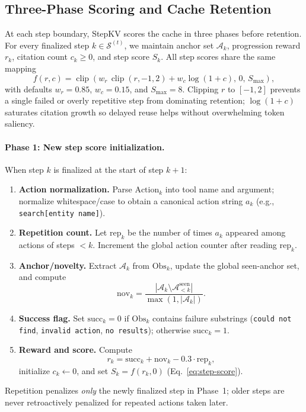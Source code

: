 \documentclass[11pt]{article}
\begin{document}
\subsection{Three-Phase Scoring and Cache Retention}
\label{sec:three-phase}

At each step boundary, StepKV scores the cache in three phases before retention.
For every finalized step $k\in\mathcal{S}^{(t)}$, we maintain anchor set $\mathcal{A}_k$, progression reward $r_k$, citation count $c_k\ge 0$, and step score $S_k$.
All step scores share the same mapping
\begin{equation}
\label{eq:step-score}
f(r,c)=\operatorname{clip}\!\left(w_r\,\operatorname{clip}(r,-1,2)+w_c\log(1+c),\,0,\,S_{\max}\right),
\end{equation}
with defaults $w_r=0.85$, $w_c=0.15$, and $S_{\max}=8$.
Clipping $r$ to $[-1,2]$ prevents a single failed or overly repetitive step from dominating retention; $\log(1+c)$ saturates citation growth so delayed reuse helps without overwhelming token saliency.

\paragraph{Phase 1: New step score initialization.}
When step $k$ is finalized at the start of step $k{+}1$:
\begin{enumerate}[leftmargin=*, nosep]
    \item \textbf{Action normalization.} Parse $\text{Action}_k$ into tool name and argument; normalize whitespace/case to obtain a canonical action string $a_k$ (e.g., \texttt{search[entity name]}).
    \item \textbf{Repetition count.} Let $\mathrm{rep}_k$ be the number of times $a_k$ appeared among actions of steps $<k$. Increment the global action counter after reading $\mathrm{rep}_k$.
    \item \textbf{Anchor/novelty.} Extract $\mathcal{A}_k$ from $\text{Obs}_k$, update the global seen-anchor set, and compute
    \[
    \mathrm{nov}_k = \frac{|\mathcal{A}_k\setminus \mathcal{A}^{\mathrm{seen}}_{<k}|}{\max(1,|\mathcal{A}_k|)}.
    \]
    \item \textbf{Success flag.} Set $\mathrm{succ}_k=0$ if $\text{Obs}_k$ contains failure substrings (\texttt{could not find}, \texttt{invalid action}, \texttt{no results}); otherwise $\mathrm{succ}_k=1$.
    \item \textbf{Reward and score.} Compute
    \begin{equation}
    \label{eq:reward}
    r_k = \mathrm{succ}_k + \mathrm{nov}_k - 0.3\cdot\mathrm{rep}_k,
    \end{equation}
    initialize $c_k\leftarrow 0$, and set $S_k = f(r_k, 0)$ (Eq.~\eqref{eq:step-score}).
\end{enumerate}
Repetition penalizes \emph{only} the newly finalized step in Phase~1; older steps are never retroactively penalized for repeated actions taken later.
\end{document}
